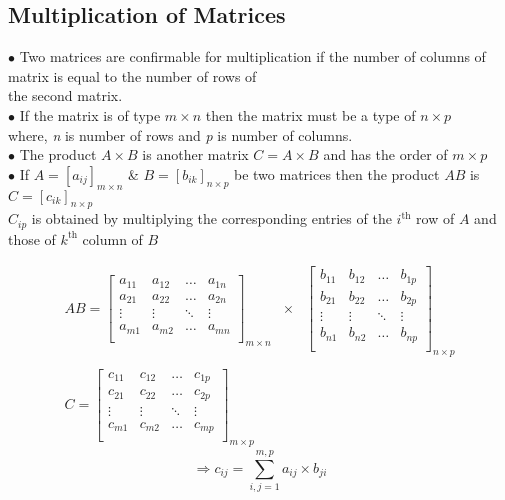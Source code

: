 \documentclass{article}
\begin{document}
	\subsection{Multiplication of Matrices}
	$ \bullet $ Two matrices are confirmable for multiplication if the number of columns of matrix is equal to the number of rows of \\ \tabto{0.35cm} the second matrix. \\
	$ \bullet $ If the matrix is of type $ m \times n $ then the matrix must be a type of $ n \times p $ \\ 
	\tabto{0.5cm} where, \textit{n} is number of rows and \textit{p} is number of columns. \\
	$ \bullet $ The product $ A \times B $ is another matrix $ C=A \times B $ and has the order of $ m \times p $ \\
	$ \bullet $ If $ A={\left[ a_{ij}\right]}_{m \times n} $   \&  $ B={\left[ b_{ik}\right]}_{n \times p} $ be two matrices then the product $ AB $ is $ C={\left[ c_{ik}\right]}_{n \times p} $ \\ \tabto{0.35cm} $C_{ip}$ is obtained by multiplying the corresponding entries of the $ i^{\text{th}} $ row of $ A $ and those of $ k^{\text{th}} $ column of $ B $
	
	$$\begin{array}{ccc}
		AB = { \left[ \begin{array}{cccc}
				a_{11} & a_{12} & \dots & a_{1n} \\
				a_{21} & a_{22} & \dots & a_{2n} \\
				\vdots & \vdots & \ddots & \vdots \\
				a_{m1} & a_{m2} & \dots & a_{mn} \\
			\end{array}\right] }_{m \times n}
						&
					\times
						&
		{ \left[ \begin{array}{cccc}
				b_{11} & b_{12} & \dots & b_{1p} \\
				b_{21} & b_{22} & \dots & b_{2p} \\
				\vdots & \vdots & \ddots & \vdots \\
				b_{n1} & b_{n2} & \dots & b_{np} \\
			\end{array}\right] }_{n \times p}
						\\ \\
		C = { \left[ \begin{array}{cccc}
				c_{11} & c_{12} & \dots & c_{1p} \\
				c_{21} & c_{22} & \dots & c_{2p} \\
				\vdots & \vdots & \ddots & \vdots \\
				c_{m1} & c_{m2} & \dots & c_{mp} \\
			\end{array}\right] }_{m \times p} 
	\end{array}$$
	$$ \Longrightarrow c_{ij} = \sum_{i,j=1}^{m,p} a_{ij} \times b_{ji} $$
\end{document}
